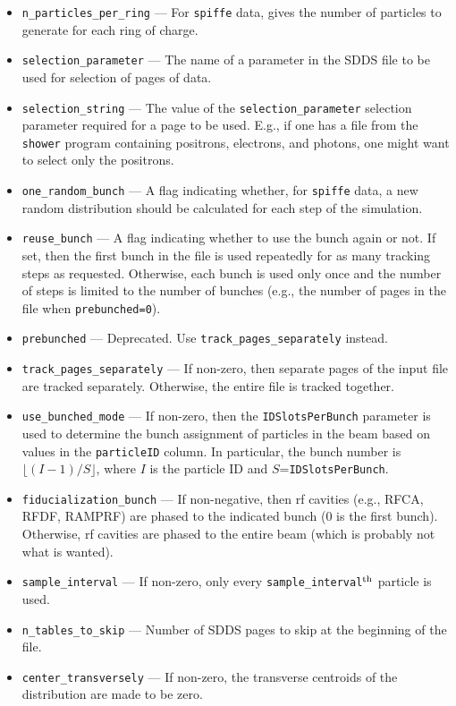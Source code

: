 \documentclass[11pt]{article}
\begin{document}
\begin{itemize}
\item \verb|n_particles_per_ring| --- For {\tt spiffe} data, gives the number of particles to
generate for each ring of charge.
\item \verb|selection_parameter| --- The name of a parameter in the SDDS file to be used for selection
of pages of data.
\item \verb|selection_string| --- The value of the
\verb|selection_parameter| selection parameter required for a page to
be used.  E.g., if one has a file from the {\tt shower} program
containing positrons, electrons, and photons, one might want to select
only the positrons.
\item \verb|one_random_bunch| --- A flag indicating whether, for {\tt spiffe} data, a new random
distribution should be calculated for each step of the simulation.
\item \verb|reuse_bunch| --- A flag indicating whether to use the bunch again or not.  If set, then the first bunch in the
file is used repeatedly for as many tracking steps as requested.  Otherwise, each bunch is used only once and the number of
steps is limited to the number of bunches (e.g., the number of pages in the file when \verb|prebunched=0|).
\item \verb|prebunched| --- Deprecated. Use \verb|track_pages_separately| instead.
\item \verb|track_pages_separately| --- If non-zero, then separate pages of the input file are tracked separately. Otherwise, the 
  entire file is tracked together.
\item \verb|use_bunched_mode| --- If non-zero, then the \verb|IDSlotsPerBunch| parameter is used to determine the bunch assignment of
  particles in the beam based on values in the \verb|particleID| column. In particular, the bunch number is $\lfloor (I-1)/S \rfloor$, where
  $I$ is the particle ID and $S$=\verb|IDSlotsPerBunch|.
\item \verb|fiducialization_bunch| --- If non-negative, then rf cavities (e.g., RFCA, RFDF, RAMPRF) are phased to the
  indicated bunch (0 is the first bunch). Otherwise, rf cavities are phased to the entire beam (which is probably not what is wanted).
\item \verb|sample_interval| --- If non-zero, only every \verb|sample_interval|$^{\rm th}$ particle is used.
\item \verb|n_tables_to_skip| --- Number of SDDS pages to skip at the beginning of the file.
\item \verb|center_transversely| --- If non-zero, the transverse centroids of the distribution are made to be zero.

\end{itemize}
\end{document}
